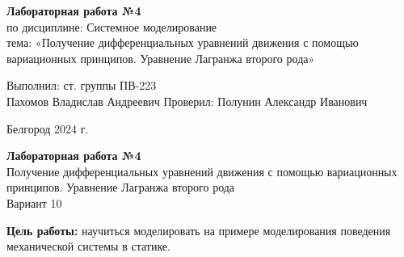 \documentclass[a4paper,14pt]{extarticle}
\newcommand\textbox[1]{
	\parbox{.45\textwidth}{#1}
}
\begin{document}
\vfill
\begin{center}
    \large{
        \textbf{
            Лабораторная работа №4}}\\
    \normalsize{
        по дисциплине: Системное моделирование \\
        тема: «Получение дифференциальных уравнений движения с помощью вариационных принципов. Уравнение Лагранжа второго рода»}
\end{center}
\vfill
\hfill\textbox{
    Выполнил: ст. группы ПВ-223\\Пахомов Владислав Андреевич
    \bigbreak
    Проверил: Полунин Александр Иванович
}
\vfill\begin{center}
    Белгород 2024 г.
\end{center}
\newpage
\begin{center}
    \textbf{Лабораторная работа №4}\\
    Получение дифференциальных уравнений движения с помощью вариационных принципов. Уравнение Лагранжа второго рода\\
    Вариант 10
\end{center}
\textbf{Цель работы: }научиться моделировать на примере моделирования поведения механической системы в статике.
\end{document}
